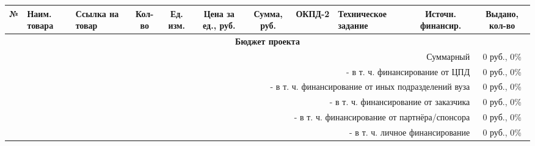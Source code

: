 \documentclass{article}
\begin{document}
\renewcommand{\arraystretch}{1.3}
\setlength{\tabcolsep}{5pt} 
\begin{longtable}{|c|p{1cm}|p{3cm}|c|c|c|c|c|p{4cm}|c|c|}
    \hline
    \textbf{№} & \textbf{Наим. товара} & \textbf{Ссылка на товар} & \textbf{Кол-во} & \textbf{Ед. изм.} & \textbf{Цена за ед., руб.} & \textbf{Сумма, руб.} & \textbf{ОКПД-2} & \textbf{Техническое задание} & \textbf{Источн. финансир.} & \textbf{Выдано, кол-во} \\
    \hline
    \multicolumn{11}{|c|}{\textbf{Бюджет проекта}} \\
    \hline
    \multicolumn{10}{|r|}{Суммарный} & 0 руб., 0\% \\
    \multicolumn{10}{|r|}{- в т. ч. финансирование от ЦПД} & 0 руб., 0\% \\
    \multicolumn{10}{|r|}{- в т. ч. финансирование от иных подразделений вуза} & 0 руб., 0\% \\
    \multicolumn{10}{|r|}{- в т. ч. финансирование от заказчика} & 0 руб., 0\% \\
    \multicolumn{10}{|r|}{- в т. ч. финансирование от партнёра/спонсора} & 0 руб., 0\% \\
    \multicolumn{10}{|r|}{- в т. ч. личное финансирование} & 0 руб., 0\% \\
    \hline
\end{longtable}
\end{document}

